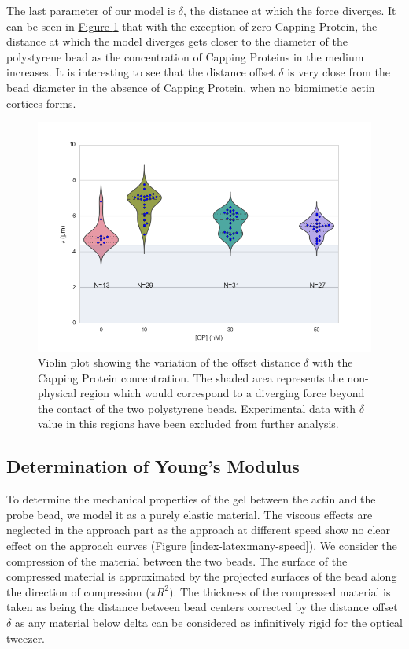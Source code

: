 \documentclass[A4paperpaper,11pt,english]{sphinxmanual}
\begin{document}
The last parameter of our model is \(\delta\), the distance at which the force
diverges.   It can be seen in \hyperref[index-latex:delta-violin]{Figure  \ref*{index-latex:delta-violin}} that with the exception
of zero Capping Protein, the distance at which the model diverges gets
closer to the diameter of the polystyrene bead as the concentration of Capping
Proteins in the medium increases. It is interesting to see that the distance offset
\(\delta\) is very close from the bead diameter in the absence of Capping Protein, when no
biomimetic actin cortices forms.
\begin{figure}[htbp]
\centering
\capstart

\includegraphics[width=0.800\linewidth]{delta_violin.png}
\caption{Violin plot showing the variation of the offset distance \(\delta\)
with the Capping Protein concentration. The shaded area represents the
non-physical region which would correspond to a diverging force beyond the
contact of the two polystyrene beads. Experimental data with \(\delta\)
value in this regions have been excluded from further analysis.}\label{index-latex:delta-violin}\end{figure}


\subsection{Determination of Young's Modulus}
\label{index-latex:determination-of-young-s-modulus}
To determine the mechanical properties of the gel between the actin and the
probe bead, we model it as a purely elastic material. The viscous effects are
neglected in the approach part as the approach at different speed show no
clear effect on the approach curves (\hyperref[index-latex:many-speed]{Figure  \ref*{index-latex:many-speed}}). We consider
the compression of the material between the two beads. The surface of the
compressed material is approximated by the projected surfaces of the bead along the
direction of compression (\(\pi R^2\)).  The thickness of the compressed
material is taken as being the distance between bead centers corrected by the
distance offset \(\delta\) as any material below delta can be considered as
infinitively rigid for the optical tweezer.
\end{document}
